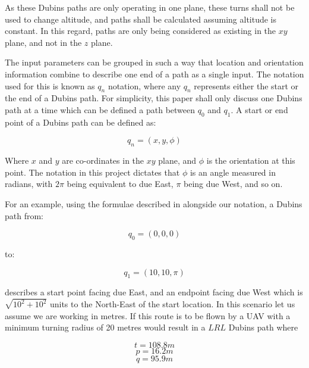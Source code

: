As these Dubins paths are only operating in one plane, these turns shall not be used to change altitude, and paths shall be calculated assuming altitude is constant. In this regard, paths are only being considered as existing in the $xy$ plane, and not in the $z$ plane. 

The input parameters can be grouped in such a way that location and orientation information combine to describe one end of a path as a single input. The notation used for this is known as $q_n$ notation, where any $q_n$ represents either the start or the end of a Dubins path. For simplicity, this paper shall only discuss one Dubins path at a time which can be defined a path between $q_0$ and $q_1$. A start or end point of a Dubins path can be defined as:

\begin{equation}
q_n = (x,y,\phi)
\end{equation}

Where $x$ and $y$ are co-ordinates in the $xy$ plane, and $\phi$ is the orientation at this point. The notation in this project dictates that $\phi$ is an angle measured in radians, with $2\pi$ being equivalent to due East, $\pi$ being due West, and so on. 

For an example, using the formulae described in \cite{shkel2001classification} alongside our notation, a Dubins path from:

\begin{equation}
q_0 = (0,0,0)
\end{equation}

to:

\begin{equation}
q_1 = (10,10,\pi)
\end{equation}

describes a start point facing due East, and an endpoint facing due West which is $\sqrt{10^2 + 10^2}$ units to the North-East of the start location. In this scenario let us assume we are working in metres. If this route is to be flown by a UAV with a minimum turning radius of 20 metres would result in a $LRL$ Dubins path where

\begin{equation}
t = 108.8m 
\end{equation}
\begin{equation}
p = 16.2m 
\end{equation}
\begin{equation}
q = 95.9m 
\end{equation}

